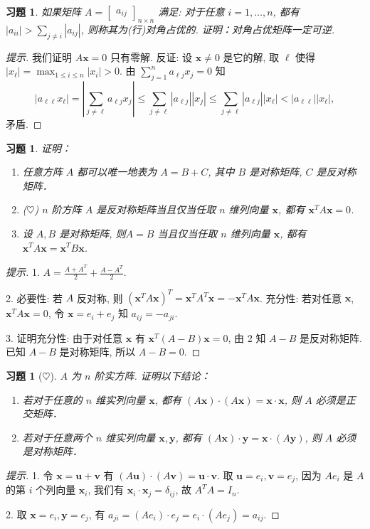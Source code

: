\documentclass[UTF8]{ctexart}
\newcommand{\bv}{{\bm v}}
\newcommand{\bu}{{\bm u}}
\newcommand{\bx}{{\bm x}}
\newcommand{\by}{{\bm y}}
\newtheorem{ex}[thm]{习题}
\begin{document}
\begin{ex}
	如果矩阵 $A=\begin{bmatrix}
	a_{ij}
	\end{bmatrix}_{n\times n}$ 满足: 对于任意 $i=1,\dots,n$, 都有 $|a_{ii}|>\sum_{j\ne i}|a_{ij}|$, 则称其为(行)对角占优的. 证明：对角占优矩阵一定可逆.
\end{ex}
\begin{proof}[提示]
	我们证明 $A\bx=0$ 只有零解. 反证: 设 $\bx\neq0$ 是它的解, 取 $\ell$ 使得 $|x_\ell|=\max_{1\leq i\leq n}|x_i|>0$. 由 $\sum_{j=1}^na_{\ell j}x_j=0$ 知
	$$|a_{\ell\ell}x_\ell|=\left|\sum_{j\neq \ell}a_{\ell j}x_j\right|\leq\sum_{j\neq\ell}|a_{\ell j}||x_j|\leq \sum_{j\neq\ell}|a_{\ell j}||x_\ell|<|a_{\ell\ell}||x_\ell|,$$
	矛盾.
\end{proof}
\begin{ex}
	证明：
	\begin{enumerate}
		\item 任意方阵 $A$ 都可以唯一地表为 $A=B+C$, 其中 $B$ 是对称矩阵, $C$ 是反对称矩阵．
		\item ($\heartsuit$) $n$ 阶方阵 $A$ 是反对称矩阵当且仅当任取 $n$ 维列向量 $\bx$, 都有 $\bx^{T}A\bx=0$.
		\item 设 $A, B$ 是对称矩阵, 则$A=B$ 当且仅当任取 $n$ 维列向量 $\bx$, 都有 $\bx^{T}A\bx=\bx^{T}B\bx$.
	\end{enumerate}
\end{ex}
\begin{proof}[提示]
	1. $A=\frac{A+A^T}{2}+\frac{A-A^T}{2}$.
	
	2. 必要性: 若 $A$ 反对称, 则 $(\bx^TA\bx)^T=\bx^TA^T\bx=-\bx^TA\bx$. 充分性: 若对任意 $\bx$, $\bx^TA\bx=0$, 令 $\bx=e_i+e_j$ 知 $a_{ij}=-a_{ji}$.
	
	3. 证明充分性: 由于对任意 $\bx$ 有 $\bx^T(A-B)\bx=0$, 由 2 知 $A-B$ 是反对称矩阵. 已知 $A-B$ 是对称矩阵, 所以 $A-B=0$.
\end{proof}


\begin{ex}[$\heartsuit$]
	$A$ 为 $n$ 阶实方阵. 证明以下结论：
	\begin{enumerate}
		\item 若对于任意的 $n$ 维实列向量 $\bx$, 都有 $(A\bx)\cdot (A\bx)=\bx\cdot\bx$, 则 $A$ 必须是正交矩阵．
		\item 若对于任意两个 $n$ 维实列向量 $\bx,\by$, 都有 $(A\bx)\cdot \by=\bx\cdot(A\by)$, 则 $A$ 必须是对称矩阵．
	\end{enumerate}
\end{ex}
\begin{proof}[提示]
	1. 令 $\bx=\bu+\bv$ 有 $(A\bu)\cdot(A\bv)=\bu\cdot\bv$. 取 $\bu=e_i,\bv=e_j$, 因为 $Ae_i$ 是 $A$ 的第 $i$ 个列向量 $\bx_i$, 我们有 $\bx_i\cdot\bx_j=\delta_{ij}$, 故 $A^TA=I_n$.
	
	2. 取 $\bx=e_i, \by=e_j$, 有 $a_{ji}=(Ae_i)\cdot e_j=e_i\cdot(Ae_j)=a_{ij}$.
\end{proof}
\end{document}
